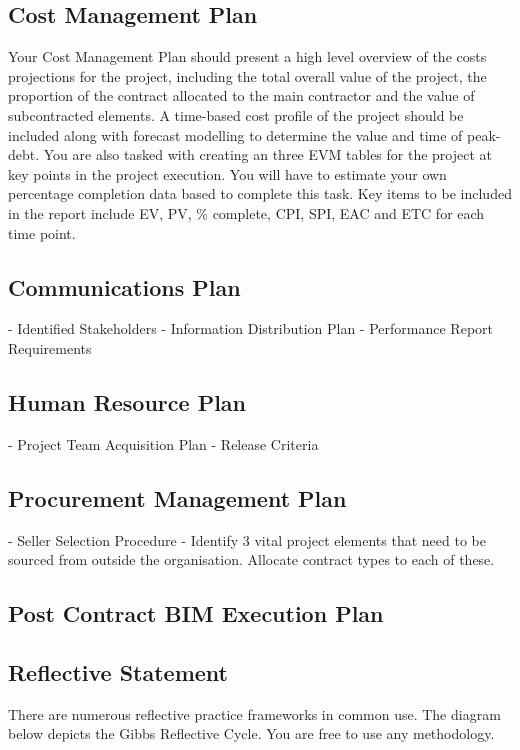 \subsection*{Cost Management Plan}
Your Cost Management Plan should present a high level overview of the costs projections for the project, including the total overall value of the project, the proportion of the contract allocated to the main contractor and the value of subcontracted elements.  A time-based cost profile of the project should be included along with forecast modelling to determine the value and time of peak-debt.  You are also tasked with creating an three EVM tables for the project at key points in the project execution.  You will have to estimate your own percentage completion data based to complete this task.  Key items to be included in the report include EV, PV, \% complete, CPI, SPI, EAC and ETC for each time point.

\subsection*{Communications Plan}
	- Identified Stakeholders
	- Information Distribution Plan
	- Performance Report Requirements
\subsection*{Human Resource Plan}
	- Project Team Acquisition Plan 
	- Release Criteria 
\subsection*{Procurement Management Plan} 
	- Seller Selection Procedure 
	- Identify 3 vital project elements that need to be sourced from outside the organisation.  Allocate contract types to each of these.
\subsection*{Post Contract BIM Execution Plan}
\subsection*{Reflective Statement} 

There are numerous reflective practice frameworks in common use.  The diagram below depicts the Gibbs Reflective Cycle.  You are free to use any methodology.


